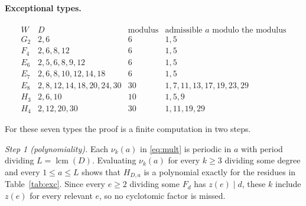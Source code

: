 \documentclass[11pt,a4paper]{article}
\theoremstyle{definition}\newtheorem{definition}[theorem]{Definition}
\theoremstyle{remark}\newtheorem{remark}[theorem]{Remark}\newtheorem{example}[theorem]{Example}
\numberwithin{equation}{section}
\begin{document}
\paragraph{Exceptional types.}
\begin{table}[ht]\centering
\[
\begin{array}{c|l|c|l}
 W&D&\text{modulus}&\text{admissible }a\text{ modulo the modulus}\\ \hline
 G_2&2,6&6&1,5\\
 F_4&2,6,8,12&6&1,5\\
 E_6&2,5,6,8,9,12&6&1,5\\
 E_7&2,6,8,10,12,14,18&6&1,5\\
 E_8&2,8,12,14,18,20,24,30&30&1,7,11,13,17,19,23,29\\
 H_3&2,6,10&10&1,5,9\\
 H_4&2,12,20,30&30&1,11,19,29
\end{array}
\]
\caption{Degrees and admissible shifts for the exceptional types.}\label{tab:exc}
\end{table}
For these seven types the proof is a finite computation in two steps.

\emph{Step 1 (polynomiality).} Each $\nu_k(a)$ in \eqref{eq:mult} is periodic in $a$ with period dividing $L=\operatorname{lcm}(D)$. Evaluating $\nu_k(a)$ for every $k\ge3$ dividing some degree and every $1\le a\le L$ shows that $H_{D,a}$ is a polynomial exactly for the residues in Table~\ref{tab:exc}. Since every $e\ge2$ dividing some $F_d$ has $z(e)\mid d$, these $k$ include $z(e)$ for every relevant $e$, so no cyclotomic factor is missed.
\end{document}
